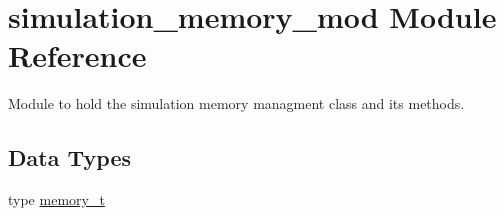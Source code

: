 \hypertarget{namespacesimulation__memory__mod}{}\section{simulation\+\_\+memory\+\_\+mod Module Reference}
\label{namespacesimulation__memory__mod}


Module to hold the simulation memory managment class and its methods.  


\subsection*{Data Types}
\begin{DoxyCompactItemize}
\item 
type \mbox{\hyperlink{structsimulation__memory__mod_1_1memory__t}{memory\+\_\+t}}
\end{DoxyCompactItemize}
